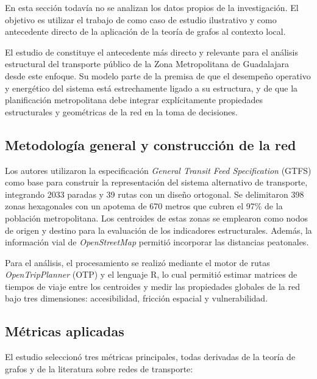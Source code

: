         En esta sección todavía no se analizan los datos propios de la investigación. El objetivo es utilizar el trabajo de \cite{barraza2021} como caso de estudio ilustrativo y como antecedente directo de la aplicación de la teoría de grafos al contexto local.
        
        El estudio de \cite{barraza2021} constituye el antecedente más directo y relevante para el análisis estructural del transporte público de la Zona Metropolitana de Guadalajara desde este enfoque. Su modelo parte de la premisa de que el desempeño operativo y energético del sistema está estrechamente ligado a su estructura, y de que la planificación metropolitana debe integrar explícitamente propiedades estructurales y geométricas de la red en la toma de decisiones.

        \subsection{Metodología general y construcción de la red}

        Los autores utilizaron la especificación \textit{General Transit Feed Specification} (GTFS) como base para construir la representación del sistema alternativo de transporte, integrando 2033 paradas y 39 rutas con un diseño ortogonal. Se delimitaron 398 zonas hexagonales con un apotema de 670 metros que cubren el 97\% de la población metropolitana. Los centroides de estas zonas se emplearon como nodos de origen y destino para la evaluación de los indicadores estructurales. Además, la información vial de \textit{OpenStreetMap} permitió incorporar las distancias peatonales.

        Para el análisis, el procesamiento se realizó mediante el motor de rutas \textit{OpenTripPlanner} (OTP) y el lenguaje \textsf{R}, lo cual permitió estimar matrices de tiempos de viaje entre los centroides y medir las propiedades globales de la red bajo tres dimensiones: accesibilidad, fricción espacial y vulnerabilidad.

        \subsection{Métricas aplicadas}

            El estudio seleccionó tres métricas principales, todas derivadas de la teoría de grafos y de la literatura sobre redes de transporte:

